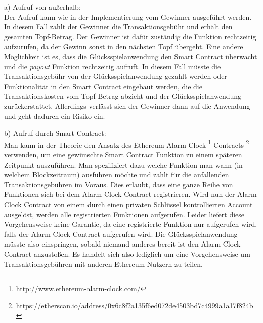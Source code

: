 a) Aufruf von außerhalb:\\
Der Aufruf kann wie in der Implementierung vom Gewinner ausgeführt werden. In diesem Fall zahlt der Gewinner die Transaktionsgebühr und erhält den gesamten Topf-Betrag. Der Gewinner ist dafür zuständig die Funktion rechtzeitig aufzurufen, da der Gewinn sonst in den nächsten Topf übergeht. Eine andere Möglichkeit ist es, dass die Glücksspielanwendung den Smart Contract überwacht und die \textit{payout} Funktion rechtzeitig aufruft. In diesem Fall müsste die Transaktionsgebühr von der Glücksspielanwendung gezahlt werden oder Funktionalität in den Smart Contract eingebaut werden, die die Transaktionskosten vom Topf-Betrag abzieht und der Glücksspielanwendung zurückerstattet. Allerdings verlässt sich der Gewinner dann auf die Anwendung und geht dadurch ein Risiko ein.

b) Aufruf durch Smart Contract:\\
Man kann in der Theorie den Ansatz des Ethereum Alarm Clock \footnote{\url{http://www.ethereum-alarm-clock.com/}} Contracts \footnote{\url{https://etherscan.io/address/0x6c8f2a135f6ed072de4503bd7c4999a1a17f824b}} verwenden, um eine gewünschte Smart Contract Funktion zu einem späteren Zeitpunkt auszuführen. Man spezifiziert dazu welche Funktion man wann (in welchem Blockzeitraum) ausführen möchte und zahlt für die anfallenden Transaktionsgebühren im Voraus. Dies erlaubt, dass eine ganze Reihe von Funktionen sich bei dem Alarm Clock Contract registrieren. Wird nun der Alarm Clock Contract von einem durch einen privaten Schlüssel kontrollierten Account ausgelöst, werden alle registrierten Funktionen aufgerufen. Leider liefert diese Vorgehensweise keine  Garantie, da eine registrierte Funktion nur aufgerufen wird, falls der Alarm Clock Contract aufgerufen wird. Die Glücksspielanwendung müsste also einspringen, sobald niemand anderes bereit ist den Alarm Clock Contract anzustoßen. Es handelt sich also lediglich um eine Vorgehensweise um Transaktionsgebühren mit anderen Ethereum Nutzern zu teilen.
